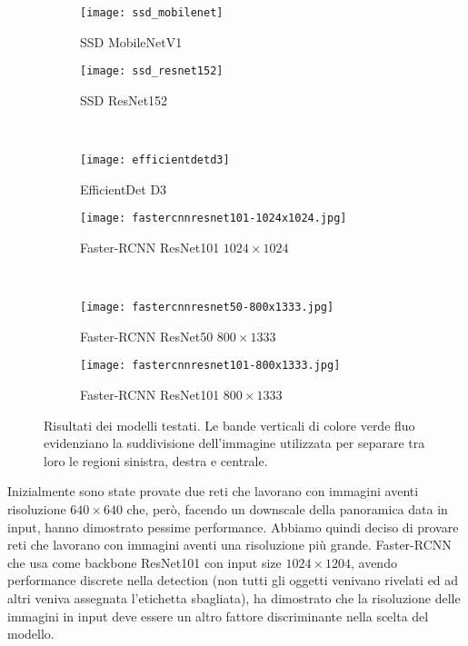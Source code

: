\begin{figure}[t]
    \centering
    \hfill
    \begin{subfigure}[b]{0.49\textwidth}
        \centering
        \texttt{[image: ssd\_mobilenet]}
        \caption{SSD MobileNetV1}
    \end{subfigure}
    \hfill
    \begin{subfigure}[b]{0.49\textwidth}
        \centering
        \texttt{[image: ssd\_resnet152]}
        \caption{SSD ResNet152}
    \end{subfigure}
    \hfill \\
    \hfill
    \begin{subfigure}[b]{0.49\textwidth}
        \centering
        \texttt{[image: efficientdetd3]}
        \caption{EfficientDet D3}
    \end{subfigure}
    \hfill
    \begin{subfigure}[b]{0.49\textwidth}
        \centering
        \texttt{[image: fastercnnresnet101-1024x1024.jpg]}
        \caption{Faster-RCNN ResNet101 $1024\times 1024$}
    \end{subfigure}
    \hfill \\
    \hfill
    \begin{subfigure}[b]{0.49\textwidth}
        \centering
        \texttt{[image: fastercnnresnet50-800x1333.jpg]}
        \caption{Faster-RCNN ResNet50 $800\times 1333$}
    \end{subfigure}
    \hfill
    \begin{subfigure}[b]{0.49\textwidth}
        \centering
        \texttt{[image: fastercnnresnet101-800x1333.jpg]}
        \caption{Faster-RCNN ResNet101 $800\times 1333$}
    \end{subfigure}
    \hfill
    \caption{Risultati dei modelli testati. Le bande verticali di colore verde fluo evidenziano la suddivisione dell’immagine utilizzata per separare tra loro le regioni sinistra, destra e centrale.}
\end{figure}

Inizialmente sono state provate due reti che lavorano con immagini aventi risoluzione $640 \times 640$ che, però, facendo un downscale della panoramica data in input, hanno dimostrato pessime performance.
Abbiamo quindi deciso di provare reti che lavorano con immagini aventi una risoluzione più grande. Faster-RCNN che usa come backbone ResNet101 con input size $1024 \times 1204$, avendo performance discrete nella detection (non tutti gli oggetti venivano rivelati ed ad altri veniva assegnata l’etichetta sbagliata), ha dimostrato che la risoluzione delle immagini in input deve essere un altro fattore discriminante nella scelta del modello.

